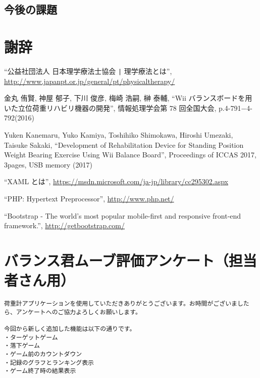 \documentclass[uplatex,a4paper,12pt]{jsreport}
\begin{document}
\section{今後の課題}\label{sec:kadai}



\chapter*{謝辞}



\begin{thebibliography}{99}%

   ``公益社団法人 日本理学療法士協会 \verb+|+ 理学療法とは'',
  \url{http://www.japanpt.or.jp/general/pt/physicaltherapy/}
    
   金丸 侑賢, 神屋 郁子, 下川 俊彦, 梅崎 浩嗣, 榊 泰輔,
  ``Wii バランスボードを用いた立位荷重リハビリ機器の開発'', 
  情報処理学会第 78 回全国大会, p.4-791$−$4-792(2016)         

   Yuken Kanemaru, Yuko Kamiya, Toshihiko Shimokawa, Hiroshi Umezaki, Taisuke Sakaki, 
  ``Development of Rehabilitation Device for Standing Position Weight Bearing Exercise Using Wii Balance Board'',
  Proceedings of ICCAS 2017, 3pages, USB memory (2017)    

   ``XAML とは'',
  \url{https://msdn.microsoft.com/ja-jp/library/cc295302.aspx}

   ``PHP: Hypertext Preprocessor'',
  \url{ http://www.php.net/ }

   ``Bootstrap - The world's most popular mobile-first and responsive front-end framework.'',      
  \url{ http://getbootstrap.com/ }

\end{thebibliography}
\appendix

\chapter{バランス君ムーブ評価アンケート（担当者さん用）}\label{h:tantou}

\begin{verbatim}
荷重計アプリケーションを使用していただきありがとうございます。お時間がございましたら、アンケートへのご協力よろしくお願いします。

今回から新しく追加した機能は以下の通りです。
・ターゲットゲーム
・落下ゲーム
・ゲーム前のカウントダウン
・記録のグラフとランキング表示
・ゲーム終了時の結果表示
\end{verbatim}
\end{document}
